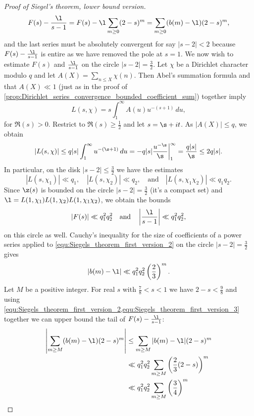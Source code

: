 \begin{proof}[Proof of Siegel's theorem, lower bound version]
\begin{equation}
          F(s)-\frac{\l}{s-1} = F(s)-\l\sum_{m \ge 0}(2-s)^{m} = \sum_{m \ge 0}(b(m)-\l)(2-s)^{m},
        \end{equation}
        and the last series must be absolutely convergent for say $|s-2| < 2$ because $F(s)-\frac{\l}{s-1}$ is entire as we have removed the pole at $s = 1$. We now wish to estimate $F(s)$ and $\frac{\l}{s-1}$ on the circle $|s-2| = \frac{3}{2}$. Let $\chi$ be a Dirichlet character modulo $q$ and let $A(X) = \sum_{n \le X}\chi(n)$. Then Abel's summation formula and that $A(X) \ll 1$ (just as in the proof of \cref{prop:Dirichlet_series_convergence_bounded_coefficient_sum}) together imply
        \[
          L(s,\chi) = s\int_{1}^{\infty}A(u)u^{-(s+1)}\,du,
        \]
        for $\Re(s) > 0$. Restrict to $\Re(s) \ge \frac{1}{2}$ and let $s = \s+it$. As $|A(X)| \le q$, we obtain
        \[
          |L(s,\chi)| \le q|s|\int_{1}^{\infty}u^{-(\s+1)}\,du = -q|s|\frac{u^{-\s}}{\s}\bigg|_{1}^{\infty} = \frac{q|s|}{\s} \le 2q|s|.
        \]
        In particular, on the disk $|s-2| \le \frac{3}{2}$ we have the estimates
        \[
          |L(s,\chi_{1})| \ll q_{1}, \quad |L(s,\chi_{2})| \ll q_{2}, \quad \text{and} \quad |L(s,\chi_{1}\chi_{2})| \ll q_{1}q_{2}.
        \]
        Since $\z(s)$ is bounded on the circle $|s-2| = \frac{3}{2}$ (it's a compact set) and $\l = L(1,\chi_{1})L(1,\chi_{2})L(1,\chi_{1}\chi_{2})$, we obtain the bounds
        \[
          |F(s)| \ll q_{1}^{2}q_{2}^{2} \quad \text{and} \quad \left|\frac{\l}{s-1}\right| \ll q_{1}^{2}q_{2}^{2},
        \]
        on this circle as well. Cauchy's inequality for the size of coefficients of a power series applied to \cref{equ:Siegels_theorem_first_version_2} on the circle $|s-2| = \frac{3}{2}$ gives
        \begin{equation}\label{equ:Siegels_theorem_first_version_3}
          |b(m)-\l| \ll q_{1}^{2}q_{2}^{2}\left(\frac{2}{3}\right)^{m}.
        \end{equation}
        Let $M$ be a positive integer. For real $s$ with $\frac{7}{8} < s < 1$ we have $2-s < \frac{9}{8}$ and using \cref{equ:Siegels_theorem_first_version_2,equ:Siegels_theorem_first_version_3} together we can upper bound the tail of $F(s)-\frac{\l}{s-1}$:
        \begin{align*}
          \left|\sum_{m \ge M}(b(m)-\l)(2-s)^{m}\right| &\le \sum_{m \ge M}|b(m)-\l|(2-s)^{m} \\
          &\ll q_{1}^{2}q_{2}^{2}\sum_{m \ge M}\left(\frac{2}{3}(2-s)\right)^{m} \\
          &\ll q_{1}^{2}q_{2}^{2}\sum_{m \ge M}\left(\frac{3}{4}\right)^{m} \\

\end{align*}
\end{proof}
